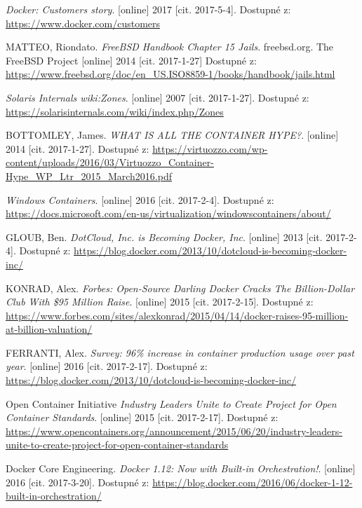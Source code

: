 \begin{thebibliography}{10}

	\emph{Docker: Customers story}. {[}online] 2017 {[}cit. 2017-5-4]. Dostupné z: \url{https://www.docker.com/customers}

MATTEO, Riondato. 
  \emph{FreeBSD Handbook Chapter 15 Jails}. freebsd.org. The FreeBSD Project {[}online] 2014 {[}cit. 2017-1-27] Dostupné z: \url{https://www.freebsd.org/doc/en_US.ISO8859-1/books/handbook/jails.html}	
  
	\emph{Solaris Internals wiki:Zones}. {[}online] 2007 {[}cit. 2017-1-27]. Dostupné z: \url{https://solarisinternals.com/wiki/index.php/Zones}	  

BOTTOMLEY, James.
	\emph{WHAT IS ALL THE CONTAINER HYPE?}. {[}online] 2014 {[}cit. 2017-1-27]. Dostupné z: \url{https://virtuozzo.com/wp-content/uploads/2016/03/Virtuozzo_Container-Hype_WP_Ltr_2015_March2016.pdf}
    
	\emph{Windows Containers}. {[}online] 2016 {[}cit. 2017-2-4]. Dostupné z: \url{https://docs.microsoft.com/en-us/virtualization/windowscontainers/about/}
       
GLOUB, Ben.
	\emph{DotCloud, Inc. is Becoming Docker, Inc}. {[}online] 2013 {[}cit. 2017-2-4]. Dostupné z: \url{https://blog.docker.com/2013/10/dotcloud-is-becoming-docker-inc/}

KONRAD, Alex.
	\emph{Forbes: Open-Source Darling Docker Cracks The Billion-Dollar Club With \$95 Million Raise}. {[}online] 2015 {[}cit. 2017-2-15]. Dostupné z: \url{https://www.forbes.com/sites/alexkonrad/2015/04/14/docker-raises-95-million-at-billion-valuation/}

FERRANTI, Alex.
	\emph{Survey: 96\% increase in container production usage over past year}. {[}online] 2016 {[}cit. 2017-2-17]. Dostupné z: \url{https://blog.docker.com/2013/10/dotcloud-is-becoming-docker-inc/}

Open Container Initiative
	\emph{Industry Leaders Unite to Create Project for Open Container Standards}. {[}online] 2015 {[}cit. 2017-2-17]. Dostupné z: \url{https://www.opencontainers.org/announcement/2015/06/20/industry-leaders-unite-to-create-project-for-open-container-standards}

Docker Core Engineering.
	\emph{Docker 1.12: Now with Built-in Orchestration!}. {[}online] 2016 {[}cit. 2017-3-20]. Dostupné z: \url{https://blog.docker.com/2016/06/docker-1-12-built-in-orchestration/}	



\end{thebibliography}
